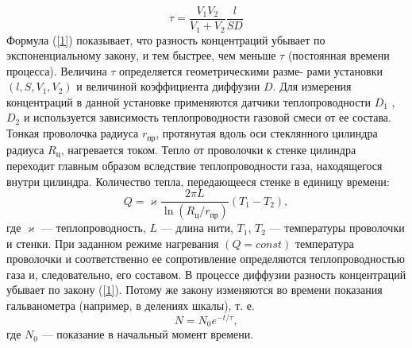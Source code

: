 \documentclass[a4paper, fontsize=12bp]{article}
\begin{document}
\begin{equation}
	\tau = \frac{V_1 V_2}{V_1 + V_2}\frac{l}{SD}
\end{equation}
Формула (\ref{1}) показывает, что разность концентраций убывает по экспоненциальному закону, и тем быстрее, чем меньше $\tau$ (постоянная
времени процесса). Величина $\tau$ определяется геометрическими разме-
рами установки $(l, S, V_1, V_2)$ и величиной коэффициента диффузии
$D$. Для измерения концентраций в данной установке применяются
датчики теплопроводности $D_1$ , $D_2$ и используется зависимость 
теплопроводности газовой смеси от ее состава. Тонкая проволочка радиуса 
$r_{\text{пр}}$, протянутая вдоль оси стеклянного цилиндра радиуса 
$R_{\text{ц}}$, нагревается током. Тепло от проволочки к стенке цилиндра
переходит главным образом вследствие теплопроводности газа, находящегося 
внутри цилиндра. Количество тепла, передающееся стенке
в единицу времени:
\[
	Q = \varkappa\frac{2\pi L}{\ln(R_{\text{ц}} / r_{\text{пр}} )}\left(T_1 - T_2 \right),
\]
где $\varkappa$ --- теплопроводность, $L$ --- длина нити, $T_1$, $T_2$ --- 
температуры проволочки и стенки. При заданном режиме нагревания $(Q = const)
$ температура проволочки и соответственно ее сопротивление определяются 
теплопроводностью газа и, следовательно, его составом. В процессе диффузии 
разность концентраций убывает по закону (\ref{1}). Потому же закону изменяются во времени показания гальванометра (например, в делениях шкалы), т. е.
\[
	N = N_0e^{-t/\tau},
\]
где $N_0$ --- показание в начальный момент времени.
\end{document}
